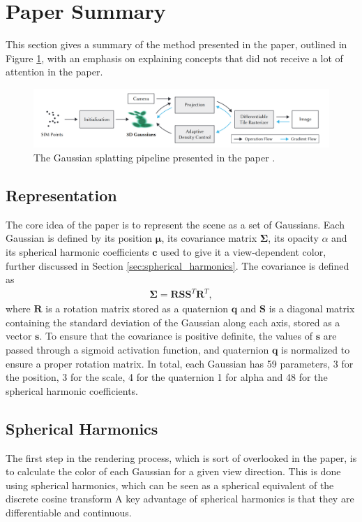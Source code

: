 

\section{Paper Summary}
This section gives a summary of the method presented in the paper, outlined in Figure \ref{fig:pipeline},
with an emphasis on explaining concepts that did not receive a lot of attention in the paper.

\begin{figure}
    \centering
    \includegraphics[width=\textwidth]{images/pipeline.png}
    \caption{The Gaussian splatting pipeline presented in the paper \cite[Fig. 2]{kerbl3DGaussianSplatting2023}.}
    \label{fig:pipeline}
\end{figure}


\subsection{Representation}
The core idea of the paper is to represent the scene as a set of Gaussians.
Each Gaussian is defined by its position $\bm{\mu}$, its covariance matrix $\bm{\Sigma}$, its opacity $\alpha$ and its spherical harmonic coefficients $\bm{c}$ used to give it a view-dependent color, further discussed in Section \ref{sec:spherical_harmonics}.
The covariance is defined as
\begin{align}
    \bm{\Sigma} = \bm{R} \bm{S} \bm{S}^T \bm{R}^T,
\end{align}
where $\bm{R}$ is a rotation matrix stored as a quaternion $\bm{q}$ and $\bm{S}$ is a diagonal matrix containing the standard deviation of the Gaussian along each axis, stored as a vector $\bm{s}$.
To ensure that the covariance is positive definite, the values of $\bm{s}$ are passed through a sigmoid activation function, and quaternion $\bm{q}$ is normalized to ensure a proper rotation matrix.
In total, each Gaussian has 59 parameters, 3 for the position, 3 for the scale, 4 for the quaternion 1 for alpha and 48 for the spherical harmonic coefficients.

\subsection{Spherical Harmonics}
The first step in the rendering process, which is sort of overlooked in the paper, is to calculate the color of each Gaussian for a given view direction.
This is done using spherical harmonics, which can be seen as a spherical equivalent of the discrete cosine transform
A key advantage of spherical harmonics is that they are differentiable and continuous.

